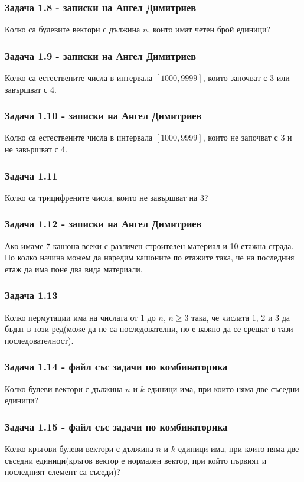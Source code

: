 \documentclass[12pt]{article}
\begin{document}
\subsubsection*{Задача 1.8 - записки на Ангел Димитриев}
Колко са булевите вектори с дължина $n$, които имат четен брой единици?
\subsubsection*{Задача 1.9 - записки на Ангел Димитриев}
Колко са естествените числа в интервала $[1000, 9999]$, които започват с 3 или завършват с 4.
\subsubsection*{Задача 1.10 - записки на Ангел Димитриев}
Колко са естествените числа в интервала $[1000, 9999]$, които не започват с 3 и не завършват с 4.
\subsubsection*{Задача 1.11}
Колко са трицифрените числа, които не завършват на 3?
\subsubsection*{Задача 1.12 - записки на Ангел Димитриев}
Ако имаме 7 кашона всеки с различен строителен материал и 10-етажна сграда. По колко начина можем да наредим кашоните по етажите така, че на последния етаж да има поне два вида материали.
\subsubsection*{Задача 1.13}
Колко пермутации има на числата от 1 до $n$, $n \geq 3$ така, че числата 1, 2 и 3 да бъдат в този ред(може да не са последователни, но е важно да се срещат в тази последователност). 
\subsubsection*{Задача 1.14 - файл със задачи по комбинаторика}
Колко булеви вектори с дължина $n$ и $k$ единици има, при които няма две съседни единици?
\subsubsection*{Задача 1.15 - файл със задачи по комбинаторика}
Колко кръгови булеви вектори с дължина $n$ и $k$ единици има, при които няма две съседни единици(кръгов вектор е нормален вектор, при който първият и последният елемент са съседи)?
\end{document}
